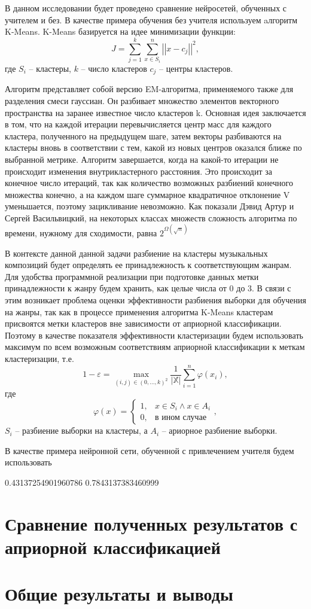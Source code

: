 В данном исследовании будет проведено сравнение
нейросетей, обученных с учителем и без. В качестве примера обучения без учителя используем aлгоритм K-Means.
K-Means базируется на идее минимизации функции:
\begin{equation}
	J = \sum_{j=1}^k \sum_{x \in S_i}^n \left|\left| x - c_j\right|\right|^2,
\end{equation}
где $S_i$ -- кластеры, $k$ -- число кластеров $c_j$ -- центры кластеров.

Алгоритм представляет собой версию EM-алгоритма, применяемого также для разделения смеси гауссиан. Он разбивает множество элементов векторного пространства на заранее известное число кластеров k.
Основная идея заключается в том, что на каждой итерации перевычисляется центр масс для каждого кластера, полученного на предыдущем шаге, затем векторы разбиваются на кластеры вновь в соответствии с тем, какой из новых центров оказался ближе по выбранной метрике.
Алгоритм завершается, когда на какой-то итерации не происходит изменения внутрикластерного расстояния. Это происходит за конечное число итераций, так как количество возможных разбиений конечного множества конечно, а на каждом шаге суммарное квадратичное отклонение V уменьшается, поэтому зацикливание невозможно.
Как показали Дэвид Артур и Сергей Васильвицкий, на некоторых классах множеств сложность алгоритма по времени, нужному для сходимости, равна $2^{\Omega ({\sqrt {n}})}$

В контексте данной данной задачи разбиение на кластеры музыкальных композиций будет определять ее принадлежность к соответствующим жанрам.
Для удобства программной реализации при подготовке данных метки принадлежности к жанру
будем хранить, как целые числа от 0 до 3. В связи с этим возникает проблема оценки эффективности
разбиения выборки для обучения на жанры, так как в процессе применения алгоритма K-Means кластерам
присвоятся метки кластеров вне зависимости от априорной классификации. Поэтому в качестве показателя эффективности
кластеризации будем использовать максимум по всем возможным соответствиям априорной классификации к меткам кластеризации, т.е.
\begin{equation}
	1 - \varepsilon = \underset{(i,j) \in (0, \dots, k)^2}{\max} \frac{1}{\left|\mathbb{X}\right|}\sum_{i=1}^n \varphi(x_i),
\end{equation}
где
	$$\varphi(x) = 
	\begin{cases}
		1, &  x \in S_i \wedge x \in A_i \\
		0, & \text{в ином случае}
	\end{cases}, $$
	$S_i$ -- разбиение выборки на кластеры, а $A_i$ -- ариорное разбиение выборки.

В качестве примера нейронной сети, обученной с привлечением учителя будем использовать 

0.43137254901960786
0.7843137383460999

\chapter{Сравнение полученных результатов с априорной классификацией}
\chapter{Общие результаты и выводы}